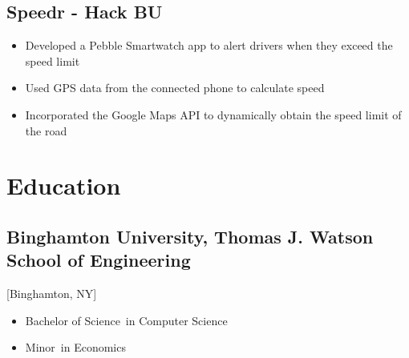 \documentclass{mycv}
\begin{document}
\subsection{Speedr - Hack BU}
\begin{itemize}
  \item Developed a Pebble Smartwatch app to alert drivers when they exceed the speed limit
  \item Used GPS data from the connected phone to calculate speed
  \item Incorporated the Google Maps API to dynamically obtain the speed limit of the road   
\end{itemize}

\section{Education}

\subsection{Binghamton University, Thomas J. Watson School of Engineering}[Binghamton, NY]
\vspace{-\parskip}%
\begin{itemize}[label={}]
  \item Bachelor of Science\ in Computer Science 
  \item Minor\ in Economics
\end{itemize}
\end{document}
